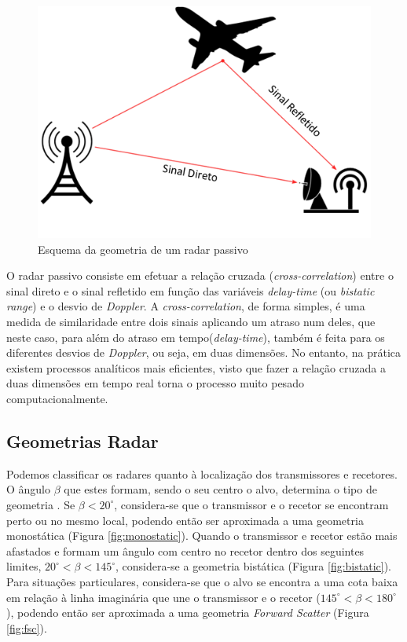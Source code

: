 \begin{figure}[h]
\centering
\includegraphics[scale=0.7]{chapters/ch2/assets/esquema_pcl}
\caption[Esquema Geometria Radar Passivo]{Esquema da geometria de um radar passivo}
\label{fig:esquema_pcl}
\end{figure}

O radar passivo consiste em efetuar a relação cruzada (\textit{cross-correlation}) entre o sinal direto e o sinal refletido em função das variáveis \textit{delay-time} (ou \textit{bistatic range}) e o desvio de \textit{Doppler}. A \textit{cross-correlation}, de forma simples, é uma medida de similaridade entre dois sinais aplicando um atraso num deles, que neste caso, para além do atraso em tempo(\textit{delay-time}), também é feita para os diferentes desvios de \textit{Doppler}, ou seja, em duas dimensões. No entanto, na prática existem processos analíticos mais eficientes, visto que fazer a relação cruzada a duas dimensões em tempo real torna o processo muito pesado computacionalmente.



\subsection{Geometrias Radar}
Podemos classificar os radares quanto à localização dos transmissores e recetores. O ângulo $\beta$ que estes formam, sendo o seu centro o alvo, determina o tipo de geometria \parencite{Baker2019}. Se $\beta <20^{\circ}$, considera-se que o transmissor e o recetor se encontram perto ou no mesmo local, podendo então ser aproximada a uma geometria monostática (Figura \ref{fig:monostatic}). Quando o transmissor e recetor estão mais afastados e formam um ângulo com centro no recetor dentro dos seguintes limites, $20^{\circ}<\beta <145^{\circ}$, considera-se a geometria bistática (Figura \ref{fig:bistatic}). Para situações particulares, considera-se que o alvo se encontra a uma cota baixa em relação à linha imaginária que une o transmissor e o recetor ($145^{\circ}<\beta <180^{\circ}$), podendo então ser aproximada a uma geometria \textit{Forward Scatter} (Figura \ref{fig:fsc}).\par   

